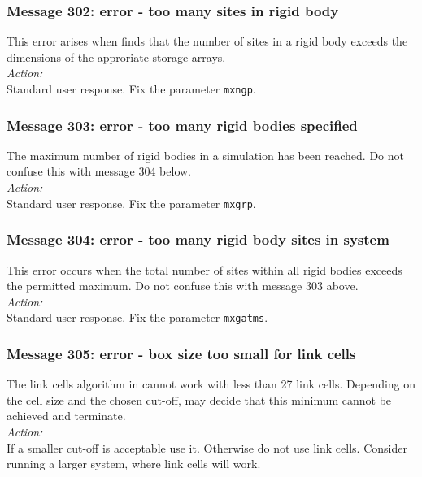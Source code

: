 \subsubsection*{Message 302: error - too many sites in rigid body}

This error arises when \D{} finds that the number of sites in a rigid
body  exceeds the dimensions of the approriate storage arrays.\\

\noindent
{\em Action:}\\
Standard user response. Fix the parameter {\tt mxngp}.

\subsubsection*{Message 303: error - too many rigid bodies specified}

The maximum number of rigid bodies  in a simulation has been reached.
Do not confuse this with message 304 below. \\

\noindent
{\em Action:}\\
Standard user response. Fix the parameter {\tt mxgrp}.

\subsubsection*{Message 304: error - too many rigid body sites in
system}

This error occurs when the total number of sites within all rigid
bodies  exceeds the permitted maximum. Do not confuse this with
message 303 above. \\

\noindent
{\em Action:} \\
Standard user response. Fix the parameter {\tt mxgatms}.

\subsubsection*{Message 305: error - box size too small for link cells}

The link cells algorithm in \D{} cannot work with less than 27 link
cells. Depending on the cell size and the chosen cut-off, \D{} may
decide that this minimum cannot be achieved and terminate.\\

\noindent
{\em Action:}\\
If a smaller cut-off is acceptable use it. Otherwise do not use link
cells. Consider running a larger system, where link cells will work.

